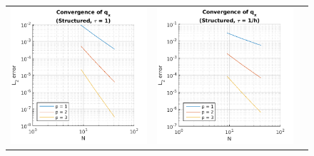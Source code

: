 \documentclass{article}
\begin{document}
\begin{figure}
\begin{tabular}{c c c}
\includegraphics[scale=0.5]{csqx_2.png} & 
\includegraphics[scale=0.5]{csqx_3.png} \\

\end{tabular}
\end{figure}
\end{document}
